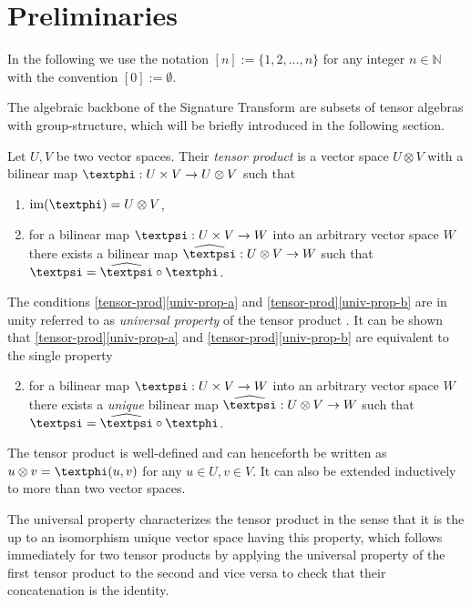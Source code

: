\documentclass[openany]{book}
\begin{document}
\section{Preliminaries}
In the following we use the notation $[n]:=\{1,2,\dots,n\}$ for any integer $n\in \mathbb N$ with the convention $[0]:=\emptyset$.
\par The algebraic backbone of the Signature Transform are  subsets of tensor algebras with group-structure, which will be briefly introduced in the following section.
\begin{definition}\label{tensor-prod}
    Let $U,V$ be two vector spaces. Their \textit{tensor product} is a vector space $U\otimes V$ with a bilinear map $\gphi:U\times V\to U\otimes V$ such that
    \begin{enumerate}[itemsep=-0.6pt, label=\alph*)]
        \item $\mathrm{im}(\gphi)= U\otimes V$,\label{univ-prop-a}
        \item for a bilinear map $\gpsi:U\times V\to W$ into an arbitrary vector space $W$ there exists a bilinear map $\widehat{\gpsi}:U\otimes V\to W$ such that $\gpsi =\widehat{\gpsi}\circ \gphi$.\label{univ-prop-b}
    \end{enumerate}
    The conditions \ref{tensor-prod}\ref{univ-prop-a} and \ref{tensor-prod}\ref{univ-prop-b} are in unity referred to as \textit{universal property} of the tensor product \cite{greub1978}. It can be shown that \ref{tensor-prod}\ref{univ-prop-a} and \ref{tensor-prod}\ref{univ-prop-b} are equivalent to the single property 
    \begin{enumerate}[itemsep=-0.6pt, label=\alph*')]
    \setcounter{enumi}{1}
        \item for a bilinear map $\gpsi:U\times V\to W$ into an arbitrary vector space $W$ there exists a \textit{unique} bilinear map $\widehat{\gpsi}:U\otimes V\to W$ such that $\gpsi =\widehat{\gpsi}\circ \gphi$.
    \end{enumerate}
    The tensor product is well-defined and can henceforth be written as $u\otimes v=\gphi(u,v)$ for any $u\in U,v\in V$. It can also be extended inductively to more than two vector spaces.
\end{definition}
The universal property characterizes the tensor product in the sense that it is the up to an isomorphism unique vector space having this property, which follows immediately for two tensor products by applying the universal property of the first tensor product to the second and vice versa to check that their concatenation is the identity.
\end{document}
